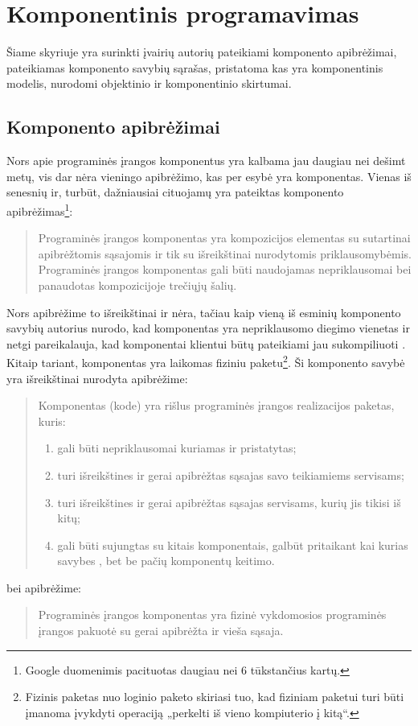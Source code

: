 \chapter{Komponentinis programavimas}

Šiame skyriuje yra surinkti įvairių autorių pateikiami komponento
apibrėžimai, pateikiamas komponento savybių sąrašas, pristatoma kas
yra komponentinis modelis, nurodomi objektinio ir komponentinio
skirtumai.

\section{Komponento apibrėžimai}

Nors apie programinės įrangos komponentus yra kalbama jau daugiau
nei dešimt metų, vis dar nėra vieningo apibrėžimo, kas per esybė
yra komponentas\cite{classification-framework-for-scm}. Vienas
iš senesnių ir, turbūt, dažniausiai cituojamų yra 
\cite{cs-beyond-object-oriented-programming}
pateiktas komponento apibrėžimas\footnote{Google duomenimis pacituotas
daugiau nei 6 tūkstančius kartų.}:
\begin{quote}
  Programinės įrangos komponentas yra kompozicijos elementas su
  sutartinai apibrėžtomis sąsajomis ir tik su išreikštinai
  nurodytomis priklausomybėmis. Programinės įrangos komponentas
  gali būti naudojamas nepriklausomai bei panaudotas
  kompozicijoje trečiųjų šalių.
\end{quote}
Nors apibrėžime to išreikštinai ir nėra, tačiau kaip vieną iš
esminių komponento savybių autorius nurodo, kad komponentas yra
nepriklausomo diegimo vienetas 
\cite[36]{cs-beyond-object-oriented-programming} ir netgi
pareikalauja, kad komponentai klientui būtų pateikiami jau
sukompiliuoti \cite{point-counterpoint}. Kitaip tariant, komponentas
yra laikomas fiziniu paketu\footnote{Fizinis paketas nuo loginio paketo
skiriasi tuo, kad fiziniam paketui turi būti įmanoma įvykdyti
operaciją „perkelti iš vieno kompiuterio į kitą“.}. Ši
komponento savybė yra išreikštinai
nurodyta \cite[385]{objects-components-and-frameworks-with-uml}
apibrėžime:
\begin{quote}
  Komponentas (kode) yra rišlus programinės įrangos realizacijos
  paketas, kuris:
  \begin{enumerate}
    \item gali būti nepriklausomai kuriamas ir pristatytas;
    \item turi išreikštines ir gerai apibrėžtas sąsajas savo teikiamiems
      servisams;
    \item turi išreikštines ir gerai apibrėžtas sąsajas servisams,
      kurių jis tikisi iš kitų;
    \item gali būti sujungtas su kitais komponentais, galbūt pritaikant
      kai kurias savybes , bet be pačių komponentų
      keitimo.
  \end{enumerate}
\end{quote}
bei \cite[1]{Hopkins:2000:CP:352183.352198} apibrėžime:
\begin{quote}
  Programinės įrangos komponentas yra fizinė vykdomosios programinės
  įrangos pakuotė su gerai apibrėžta ir vieša sąsaja.
\end{quote}


